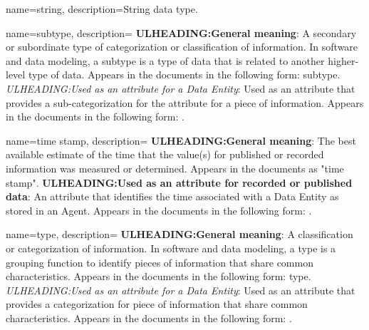 {
    name={string},
	description={String data type.}
}

{
    name={subtype},
	description={
	\textbf{ULHEADING:General meaning}:
	A secondary or subordinate type of categorization or classification of information.
	In software and data modeling, a subtype is a type of data that is related to another higher-level type of data.
	Appears in the documents in the following form: subtype.
	\textit{ULHEADING:Used as an attribute for a \gls{Data Entity}}:
	Used as an attribute that provides a sub-categorization for the  attribute for a piece of information.
	Appears in the documents in the following form: .
}
}

{
    name={time stamp},
	description={
	\textbf{ULHEADING:General meaning}:
	The best available estimate of the time that the value(s) for published or recorded information was measured or determined.
	Appears in the documents as "time stamp".
	\textbf{ULHEADING:Used as an attribute for recorded or published data}:
	An attribute that identifies the time associated with a \gls{Data Entity} as stored in an \gls{Agent}.
	Appears in the documents in the following form: .
}
}

{
    name={type},
	description={
	\textbf{ULHEADING:General meaning}:
	A classification or categorization of information.
	In software and data modeling, a type is a grouping function to identify pieces of information that share common characteristics. 
	Appears in the documents in the following form: type.
	\textit{ULHEADING:Used as an attribute for a \gls{Data Entity}}:
	Used as an attribute that provides a categorization for piece of information that share common characteristics.
	Appears in the documents in the following form: .
}
}
